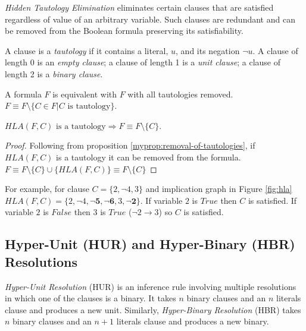 \emph{Hidden Tautology Elimination}
\cite{Heule:2010:CEP:1928380.1928406} eliminates certain clauses that
are satisfied regardless of value of an arbitrary variable. Such
clauses are redundant and can be removed from the Boolean formula
preserving its satisfiability.

\begin{mydef}
  A clause is a \emph{tautology} if it contains a literal, $u$, and its negation
  $\neg u$. A clause of length 0 is an \emph{empty clause}; a clause of length 1
  is a \emph{unit clause}; a clause of length 2 is a \emph{binary clause}. 
\end{mydef}

\begin{myprop}[TE]
  \label{myprop:removal-of-tautologies}
  A formula $F$ is equivalent with $F$ with all tautologies removed.
  $F \equiv F \setminus \{ C \in F | C \text{ is tautology}\}$.
\end{myprop}

\begin{myprop}[HTE]
  $HLA(F, C) \text{ is a tautology} \Rightarrow F \equiv F \setminus \{C\}$.
\end{myprop}

\begin{proof}
  Following from proposition \ref{myprop:removal-of-tautologies},
  if $HLA(F, C)$ is a tautology it can be removed from the formula.
  $F \equiv F \setminus \{C\} \cup \{HLA(F, C)\} \equiv F \setminus \{C\}$
\end{proof}

For example, for clause $C = \{ 2, \neg 4, 3\}$ and implication graph
in Figure \ref{fig:hla} $HLA(F, C) = \{2, \neg 4, \mathbf{\neg 5,
\neg 6}, 3, \mathbf{\neg 2} \}$.  If variable $2$ is $True$ then
$C$ is satisfied. If variable $2$ is $False$ then $3$ is $True$
($\neg 2 \rightarrow 3$) so $C$ is satisfied.


\subsection{Hyper-Unit (HUR) and Hyper-Binary (HBR) Resolutions}
\label{ssec:hbr}

\emph{Hyper-Unit Resolution} (HUR) \cite{Kusper02solvingthe} is an
inference rule involving multiple resolutions in which one of the
clauses is a binary. It takes $n$ binary clauses and an $n$ literals
clause and produces a new unit. Similarly, \emph{Hyper-Binary
Resolution} (HBR) \cite{Bacchus03effectivepreprocessing} takes
$n$ binary clauses and an $n + 1$ literals clause and produces a
new binary.

